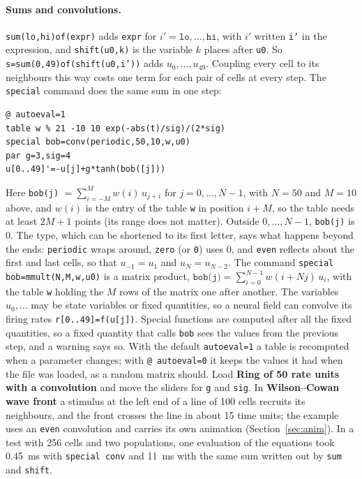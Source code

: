 \documentclass[11pt,a4paper]{article}
\newcommand{\ui}[1]{\textsf{\textbf{#1}}}          %
\begin{document}
\paragraph{Sums and convolutions.} \texttt{sum(lo,hi)of(expr)} adds \texttt{expr} for $i'=\texttt{lo},\ldots,\texttt{hi}$, with $i'$ written \texttt{i'} in the expression, and \texttt{shift(u0,k)} is the variable $k$ places after \texttt{u0}. So \texttt{s=sum(0,49)of(shift(u0,i'))} adds $u_0,\ldots,u_{49}$. Coupling every cell to its neighbours this way costs one term for each pair of cells at every step. The \texttt{special} command does the same sum in one step:
\begin{lstlisting}
@ autoeval=1
table w % 21 -10 10 exp(-abs(t)/sig)/(2*sig)
special bob=conv(periodic,50,10,w,u0)
par g=3,sig=4
u[0..49]'=-u[j]+g*tanh(bob([j]))
\end{lstlisting}
Here \texttt{bob(j)} $=\sum_{i=-M}^{M}w(i)\,u_{j+i}$ for $j=0,\ldots,N-1$, with $N=50$ and $M=10$ above, and $w(i)$ is the entry of the table \texttt{w} in position $i+M$, so the table needs at least $2M+1$ points (its range does not matter). Outside $0,\ldots,N-1$, \texttt{bob(j)} is 0. The type, which can be shortened to its first letter, says what happens beyond the ends: \texttt{periodic} wraps around, \texttt{zero} (or \texttt{0}) uses 0, and \texttt{even} reflects about the first and last cells, so that $u_{-1}=u_1$ and $u_N=u_{N-2}$. The command \texttt{special bob=mmult(N,M,w,u0)} is a matrix product, $\texttt{bob(j)}=\sum_{i=0}^{N-1}w(i+Nj)\,u_i$, with the table \texttt{w} holding the $M$ rows of the matrix one after another. The variables $u_0,\ldots$ may be state variables or fixed quantities, so a neural field can convolve its firing rates \texttt{r[0..49]=f(u[j])}. Special functions are computed after all the fixed quantities, so a fixed quantity that calls \texttt{bob} sees the values from the previous step, and a warning says so. With the default \texttt{autoeval=1} a table is recomputed when a parameter changes; with \texttt{@ autoeval=0} it keeps the values it had when the file was loaded, as a random matrix should. Load \ui{Ring of 50 rate units with a convolution} and move the sliders for \texttt{g} and \texttt{sig}. In \ui{Wilson--Cowan wave front} a stimulus at the left end of a line of 100 cells recruits its neighbours, and the front crosses the line in about 15 time units; the example uses an \texttt{even} convolution and carries its own animation (Section~\ref{sec:anim}). In a test with 256 cells and two populations, one evaluation of the equations took 0.45~ms with \texttt{special conv} and 11~ms with the same sum written out by \texttt{sum} and \texttt{shift}.
\end{document}
